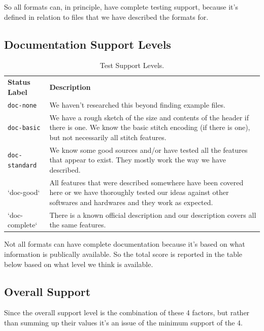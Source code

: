 \documentclass[a4paper]{report}
\begin{document}
So all formats can, in principle, have complete testing support, because it's
defined in relation to files that we have described the formats for.

\subsection{Documentation Support Levels}

\begin{longtable}{p{4cm} p{8cm}}
\caption{Test Support Levels.}
\label{tab:doc-support} \\
\textbf{Status Label} &
\textbf{Description} \\

\texttt{doc-none} &
We haven't researched this beyond finding example files. \\

\texttt{doc-basic} &
We have a rough sketch of the size and contents of the header if there is one.
We know the basic stitch encoding (if there is one), but not necessarily all
stitch features. \\

\texttt{doc-standard} &
We know some good sources and/or have tested all the features that appear to
exist. They mostly work the way we have described. \\

`doc-good` &
All features that were described somewhere have been covered here or we have
thoroughly tested our ideas against other softwares and hardwares and they work
as expected. \\

`doc-complete` &
There is a known official description and our description covers all the same
features.
\end{longtable}

Not all formats can have complete documentation because it's based on what
information is publically available. So the total score is reported in the table
below based on what level we think is available.

\subsection{Overall Support}

Since the overall support level is the combination of these
4 factors, but rather than summing up their values it's an
issue of the minimum support of the 4.
\end{document}
